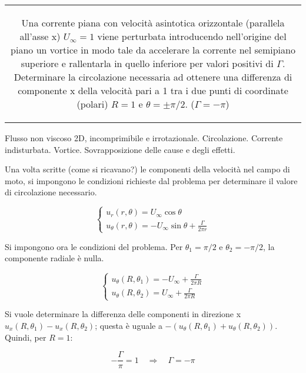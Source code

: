 \noindent
\begin{tabular}{c}
\begin{minipage}[b]{0.95\textwidth}
\begin{exerciseS}
Una corrente piana con velocit\`{a} asintotica orizzontale (parallela all'asse x) $U_\infty=1$ viene perturbata introducendo 
nell'origine del piano un vortice in modo tale da accelerare la corrente nel semipiano superiore e rallentarla 
in quello inferiore per valori positivi di $\Gamma$. Determinare la circolazione necessaria ad ottenere una differenza di componente x della velocit\`{a} pari a 1 
tra i due punti di coordinate (polari) $R=1$ e $\theta=\pm\pi/2$. 
($\Gamma = -\pi$)
\end{exerciseS}
\end{minipage}
\end{tabular}

\sol

\partone
 Flusso non viscoso 2D, incomprimibile e irrotazionale. Circolazione. Corrente indisturbata. Vortice. Sovrapposizione delle cause e degli effetti.

\parttwo
 Una volta scritte (come si ricavano?) le componenti della velocità nel campo di moto, si
impongono le condizioni richieste dal problema per determinare il valore di circolazione necessario.

\begin{equation}
\begin{cases}
  u_r (r,\theta) = U_\infty \cos{\theta} \\
  u_\theta (r,\theta) = - U_\infty \sin{\theta} + \frac{\Gamma}{2\pi r}
\end{cases}
\end{equation}

\vspace{0.2cm}
Si impongono ora le condizioni del problema. Per $\theta_1 = \pi/2$ e $\theta_2 = -\pi/2$, la componente radiale è nulla.

\begin{equation}
  \begin{cases}
    u_{\theta}(R,\theta_1) = -U_\infty + \frac{\Gamma}{2\pi R} \\
    u_{\theta}(R,\theta_2) = U_\infty + \frac{\Gamma}{2\pi R}
  \end{cases}
\end{equation}

Si vuole determinare la differenza delle componenti in direzione x $u_x(R,\theta_1) - u_x(R,\theta_2)$; questa è uguale a $-(u_\theta(R,\theta_1) + u_\theta(R,\theta_2))$. Quindi, per $R=1$:

\begin{equation}
  -\frac{\Gamma}{\pi} = 1 \quad \Rightarrow \quad \Gamma = -\pi
\end{equation}

